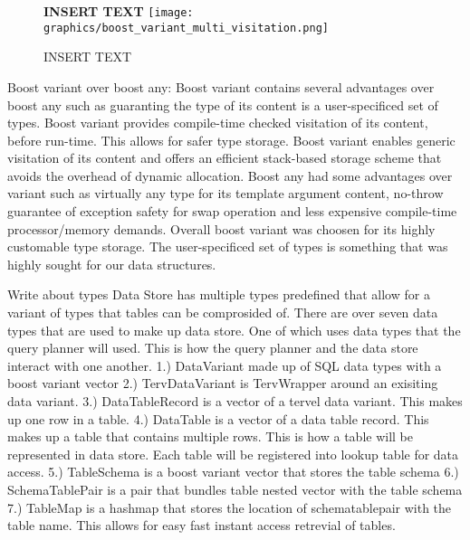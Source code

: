 \documentclass[letterpaper, 12pt]{article}
\begin{document}
\begin{figure}
  \centering
  \textbf{INSERT TEXT}
  \texttt{[image: graphics/boost\_variant\_multi\_visitation.png]}
  \caption{INSERT TEXT}
\end{figure}

Boost variant over boost any:
Boost variant contains several advantages over boost any such as guaranting the type of its
content is a user-specificed set of types. Boost variant provides compile-time checked
visitation of its content, before run-time. This allows for safer type storage. Boost variant
enables generic visitation of its content and offers an efficient stack-based storage scheme
that avoids the overhead of dynamic allocation. Boost any had some advantages over variant such
as virtually any type for its template argument content, no-throw guarantee of exception safety
for swap operation and less expensive compile-time processor/memory demands. Overall boost
variant was choosen for its highly customable type storage. The user-specificed set of types
is something that was highly sought for our data structures.
\par\vspace{\baselineskip}

Write about types
	Data Store has multiple types predefined that allow for a variant of types that tables can be
	comprosided of. There are over seven data types that are used to make up data store. One of which
	uses data types that the query planner will used. This is how the query planner and the data store
	interact with one another.
1.) DataVariant made up of SQL data types with a boost variant vector
2.)	TervDataVariant is TervWrapper around an exisiting data variant.
3.)	DataTableRecord is a vector of a tervel data variant. This makes up one row in
	a table.
4.)	DataTable is a vector of a data table record. This makes up a table that contains multiple rows.
	This is how a table will be represented in data store. Each table will be registered into lookup table
	for data access.
5.)	TableSchema is a boost variant vector that stores the table schema
6.)	SchemaTablePair is a pair that bundles table nested vector with the table schema
7.)	TableMap is a hashmap that stores the location of schematablepair with the table name. This
	allows for easy fast instant access retrevial of tables.
\end{document}
